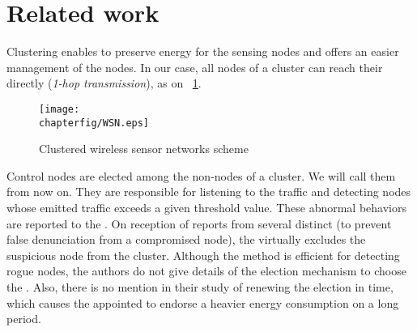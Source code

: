 \section{Related work}
\label{ea:sec:related}


Clustering enables to preserve energy for the sensing nodes and offers an easier management of the nodes.
In our case, all nodes of a cluster can reach their \ch directly (\emph{1-hop transmission}), as on \figurename~\ref{ea:fig:wsn}.
\begin{figure}[h]
    \centering
    \texttt{[image: \\chapterfig/WSN.eps]}
    \caption{Clustered wireless sensor networks scheme}\label{ea:fig:wsn}
\end{figure}

Control nodes are elected among the non-\ch nodes of a cluster.
We will call them \cns from now on.
They are responsible for listening to the traffic and detecting nodes whose emitted traffic exceeds a given threshold value.
These abnormal behaviors are reported to the \ch.
On reception of reports from several distinct \cns (to prevent false denunciation from a compromised node), the \CH virtually excludes the suspicious node from the cluster.
Although the method is efficient for detecting rogue nodes, the authors do not give details of the election mechanism to choose the \cns.
Also, there is no mention in their study of renewing the election in time, which causes the appointed \cns to endorse a heavier energy consumption on a long period.

